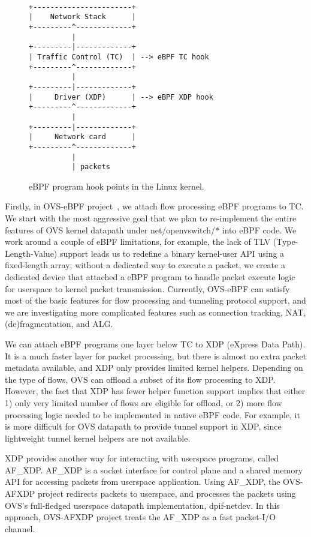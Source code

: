 \documentclass[10pt,numbers,reprint]{sigplanconf}
\begin{document}
\begin{figure}
{\scriptsize
\begin{verbatim}

+-----------------------+
|    Network Stack      |
+---------^-------------+
          |
+---------|-------------+
| Traffic Control (TC)  | --> eBPF TC hook
+---------^-------------+
          |
+---------|-------------+
|     Driver (XDP)      | --> eBPF XDP hook
+---------^-------------+
          |
+---------|-------------+
|     Network card      |
+---------^-------------+
          |
          | packets

\end{verbatim}
}
\vspace{-1.0em}
\caption{eBPF program hook points in the Linux kernel.}
\label{ebpf-hook}
\vspace{-1.0em}
\end{figure}

Firstly, in OVS-eBPF project~\cite{extensible_ovs}, we attach flow processing
eBPF programs to TC. We start with the most aggressive goal that we plan to
re-implement the entire features of OVS kernel datapath under net/openvswitch/*
into eBPF code. We work around a couple of eBPF limitations, for example, the
lack of TLV (Type-Length-Value) support leads us to redefine a binary
kernel-user API using a fixed-length array; without a dedicated way to execute
a packet, we create a dedicated device that attached a eBPF program to handle
packet execute logic for userspace to kernel packet transmission. Currently,
OVS-eBPF can satisfy most of the basic features for flow processing and
tunneling protocol support, and we are investigating more complicated features
such as connection tracking, NAT, (de)fragmentation, and ALG.

We can attach eBPF programs one layer below TC to XDP (eXpress Data Path).
It is a much faster layer for packet processing, but there is almost no extra
packet metadata available, and XDP only provides limited kernel helpers.
Depending on the type of flows, OVS can offload a subset of its flow processing
to XDP. However, the fact that XDP has fewer helper function support implies
that either 1) only very limited number of flows are eligible for offload,
or 2) more flow processing logic needed to be implemented in native eBPF code.
For example, it is more difficult for OVS datapath to provide tunnel support in
XDP, since lightweight tunnel kernel helpers are not available.

XDP provides another way for interacting with userspace programs, called AF\_XDP. 
AF\_XDP is a socket interface for control plane and a shared memory API for
accessing packets from userspace application. Using AF\_XDP, the OVS-AFXDP project
redirects packets to userspace, and processes the packets using OVS's full-fledged
userspace datapath implementation, dpif-netdev. In this approach, OVS-AFXDP
project treats the AF\_XDP as a fast packet-I/O channel.
\end{document}
